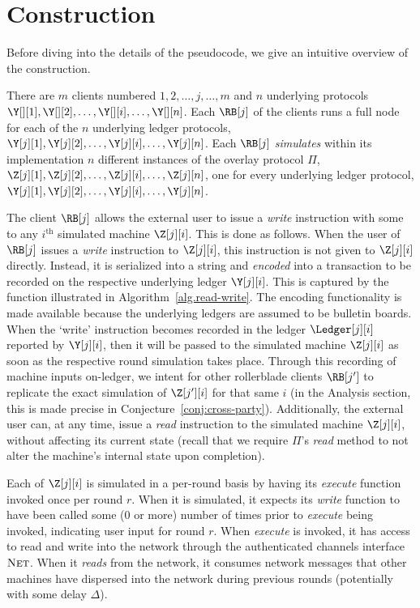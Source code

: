 \section{Construction}\label{sec:construction}

Before diving into the details of the pseudocode, we give an intuitive overview
of the \rollerblade construction.


There are $m$ \rollerblade clients numbered $1, 2, \ldots, j, \ldots, m$
and $n$ underlying protocols $\Y[][1], \Y[][2], \ldots, \Y[][i], \ldots, \Y[][n]$.
Each $\RB[j]$ of the clients runs a full node for each of the $n$ underlying
ledger protocols,
$\Y[j][1], \Y[j][2], \ldots, \Y[j][i], \ldots, \Y[j][n]$.
Each $\RB[j]$ \emph{simulates} within its implementation $n$ different instances
of the overlay protocol $\Pi$,
$\Z[j][1], \Z[j][2], \ldots, \Z[j][i], \ldots, \Z[j][n]$,
one for every underlying ledger protocol,
$\Y[j][1], \Y[j][2], \ldots, \Y[j][i], \ldots, \Y[j][n]$.

The \rollerblade client $\RB[j]$ allows the external user to issue a \emph{write} instruction
with some \data
to any $i^\text{th}$ simulated machine $\Z[j][i]$. This is done as follows. When the user
of $\RB[j]$ issues a \emph{write} instruction to $\Z[j][i]$, this instruction is not given to
$\Z[j][i]$ directly. Instead, it is serialized into a string and \emph{encoded} into a transaction
to be recorded on the respective underlying ledger $\Y[j][i]$. This is captured by
the \writeToMachine function illustrated in Algorithm~\ref{alg.read-write}.
The encoding functionality is made available because
the underlying ledgers are assumed to be bulletin boards.
When the `write' instruction becomes recorded in the ledger $\Ledger[j][i]$ reported
by $\Y[j][i]$, then it will be passed to the simulated
machine $\Z[j][i]$ as soon as the respective round simulation takes place.
Through this recording of machine inputs on-ledger, we intent for other
rollerblade clients $\RB[j']$ to replicate the exact simulation of $\Z[j'][i]$ for that
same $i$ (in the Analysis section, this is made precise in Conjecture~\ref{conj:cross-party}).
Additionally, the external user can, at any time, issue a \emph{read} instruction to
the simulated machine $\Z[j][i]$, without affecting its current state (recall that we
require $\Pi$'s \emph{read} method to not alter the machine's internal state upon completion).

Each of $\Z[j][i]$ is simulated in a per-round basis by having its \emph{execute}
function invoked once per round $r$. When it is simulated, it expects its \emph{write} function to have
been called some ($0$ or more) number of times prior to \emph{execute} being invoked,
indicating user input for round $r$. When \emph{execute} is invoked, it has access to read
and write into the network through the authenticated channels interface $\textsc{Net}$.
When it \emph{reads} from the network, it consumes network messages that other machines
have dispersed into the network during previous rounds (potentially with some delay $\Delta$).

